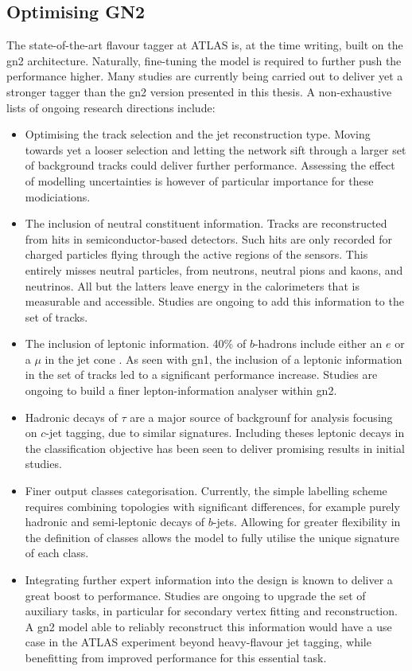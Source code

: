 
\subsection{Optimising GN2}\label{chap-GN2Opt}
The state-of-the-art flavour tagger at ATLAS is, at the time writing, built on the \gls{gn2} architecture. Naturally, fine-tuning the model is required to further push the performance higher. Many studies are currently being carried out to deliver yet a stronger tagger than the \gls{gn2} version presented in this thesis. A non-exhaustive lists of ongoing research directions include: 
\begin{itemize}
  \item Optimising the track selection and the jet reconstruction type. Moving towards yet a looser selection and letting the network sift through a larger set of background tracks could deliver further performance. Assessing the effect of modelling uncertainties is however of particular importance for these modiciations.
  \item The inclusion of neutral constituent information. Tracks are reconstructed from hits in semiconductor-based detectors. Such hits are only recorded for charged particles flying through the active regions of the sensors. This entirely misses neutral particles, from neutrons, neutral pions and kaons, and neutrinos. All but the latters leave energy in the calorimeters that is measurable and accessible. Studies are ongoing to add this information to the set of tracks. 
  \item The inclusion of leptonic information. 40\% of $b$-hadrons include either an $e$ or a $\mu$ in the jet cone \cite{Tanabashi:2018oca}. As seen with \gls{gn1}, the inclusion of a leptonic information in the set of tracks led to a significant performance increase. Studies are ongoing to build a finer lepton-information analyser within \gls{gn2}.
  \item Hadronic decays of $\tau$ are a major source of backgrounf for analysis focusing on $c$-jet tagging, due to similar signatures. Including theses leptonic decays in the classification objective has been seen to deliver promising results in initial studies. 
  \item Finer output classes categorisation. Currently, the simple labelling scheme requires combining topologies with significant differences, for example purely hadronic and semi-leptonic decays of $b$-jets. Allowing for greater flexibility in the definition of classes allows the model to fully utilise the unique signature of each class. 
  \item Integrating further expert information into the design is known to deliver a great boost to performance. Studies are ongoing to upgrade the set of auxiliary tasks, in particular for secondary vertex fitting and reconstruction. A \gls{gn2} model able to reliably reconstruct this information would have a use case in the ATLAS experiment beyond heavy-flavour jet tagging, while benefitting from improved performance for this essential task.  
\end{itemize}

